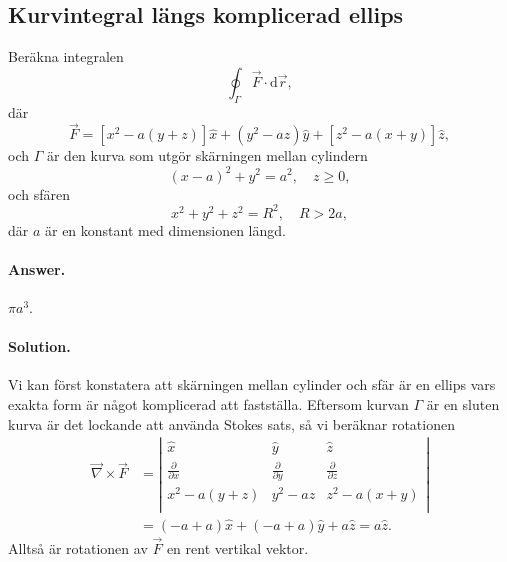 \documentclass[%
oneside,                 %
final,                   %
10pt]{article}
\newenvironment{doconceexercise}{}{}
\newcounter{doconceexercisecounter}
\begin{document}
\begin{doconceexercise}

\subsection{Kurvintegral längs komplicerad ellips}

Beräkna integralen
\begin{equation}
  \oint_\Gamma \vec{F} \cdot \mbox{d}\vec{r},
\end{equation}
där 
\begin{equation}
  \vec{F} = \left[x^2-a\left(y+z\right)\right]\hat{x} + \left(y^2-az\right)
\hat{y} + \left[z^2-a\left(x+y\right)\right] \hat{z},
\end{equation}
och $\Gamma$ är den kurva som utgör skärningen mellan cylindern
\begin{equation}
 \left(x-a\right)^2 +y^2 = a^2,\quad z \ge 0,
\end{equation}
och sfären
\begin{equation}
  x^2 + y^2 + z^2 = R^2, \quad R> 2a,
\end{equation}
där $a$ är en konstant med dimensionen längd.


\paragraph{Answer.}
$\pi a^3$.



\paragraph{Solution.}
Vi kan först konstatera att skärningen mellan cylinder och sfär är en ellips vars exakta form är något komplicerad att fastställa.  Eftersom kurvan $\Gamma$ är en sluten kurva är det lockande att använda Stokes sats, så vi beräknar rotationen
\begin{align}
  \vec{\nabla} \times \vec{F} &= 
  \left|\begin{array}{ccc}
\hat{x} & \hat{y} & \hat{z} \\
\frac{\partial}{\partial x} & \frac{\partial}{\partial y} & 
\frac{\partial}{\partial z} \\
x^2-a\left(y+z\right) & y^2-az & z^2-a\left(x+y\right) \\
\end{array} 
\right| \nonumber \\
&= \left(-a+a\right) \hat{x} + \left(-a+a\right) \hat{y} + a\hat{z}
= a\hat{z}.
\end{align}
Alltså är rotationen av $\vec{F}$ en rent vertikal vektor.  


\end{doconceexercise}
\end{document}
